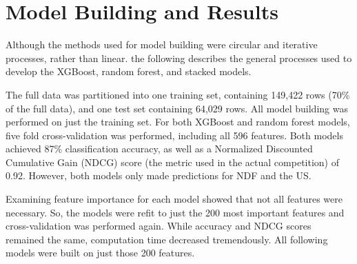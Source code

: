 \documentclass{article}
\begin{document}
\section{Model Building and Results}

Although the methods used for model building were circular and iterative processes, rather than linear. the following describes the general processes used to develop the XGBoost, random forest, and stacked models. 

The full data was partitioned into one training set, containing 149,422 rows (70\% of the full data), and one 
test set containing 64,029 rows. All model building was performed on just the training set. For both XGBoost and random forest models, five fold cross-validation was performed, including all 596 features. Both models achieved 87\% classification accuracy, as well as a Normalized Discounted Cumulative Gain (NDCG) score (the metric used in the actual competition) of 0.92. However, both models only made predictions for NDF and the US. 

Examining feature importance for each model showed that not all features were necessary. So, the models were refit to just the 200 most important features and cross-validation was performed again. While accuracy and NDCG scores remained the same, computation time decreased tremendously. All following models were built on just those 200 features. 
\end{document}
